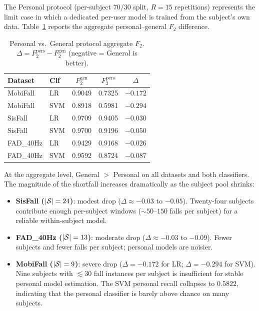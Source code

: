 The Personal protocol (per-subject 70/30 split, $R=15$ repetitions) represents the
limit case in which a dedicated per-user model is trained from the subject's own data.
Table~\ref{tab:personal-delta} reports the aggregate personal--general $F_2$ difference.

\begin{table}[h!]
\centering
\caption{Personal vs.\ General protocol aggregate $F_2$.
  $\Delta = F_2^{\mathrm{pers}} - F_2^{\mathrm{gen}}$ (negative = General is better).}
\label{tab:personal-delta}
\small
\begin{tabular}{llccc}
\toprule
\textbf{Dataset} & \textbf{Clf} & $F_2^{\mathrm{gen}}$ & $F_2^{\mathrm{pers}}$ & $\Delta$ \\
\midrule
MobiFall  & LR  & 0.9049 & 0.7325 & $-0.172$ \\
MobiFall  & SVM & 0.8918 & 0.5981 & $-0.294$ \\
SisFall   & LR  & 0.9709 & 0.9405 & $-0.030$ \\
SisFall   & SVM & 0.9700 & 0.9196 & $-0.050$ \\
FAD\_40Hz & LR  & 0.9429 & 0.9168 & $-0.026$ \\
FAD\_40Hz & SVM & 0.9592 & 0.8724 & $-0.087$ \\
\bottomrule
\end{tabular}
\end{table}

At the aggregate level, General $>$ Personal on all datasets and both classifiers.
The magnitude of the shortfall increases dramatically as the subject pool shrinks:

\begin{itemize}
\item \textbf{SisFall ($|\mathcal{S}|=24$)}: modest drop ($\Delta \approx -0.03$ to
  $-0.05$).  Twenty-four subjects contribute enough per-subject windows
  (${\sim}50$--$150$ falls per subject) for a reliable within-subject model.
\item \textbf{FAD\_40Hz ($|\mathcal{S}|=13$)}: moderate drop ($\Delta \approx -0.03$
  to $-0.09$).  Fewer subjects and fewer falls per subject; personal models are
  noisier.
\item \textbf{MobiFall ($|\mathcal{S}|=9$)}: severe drop ($\Delta=-0.172$ for LR;
  $\Delta=-0.294$ for SVM).  Nine subjects with $\lesssim30$ fall instances per
  subject is insufficient for stable personal model estimation.  The SVM personal
  recall collapses to $0.5822$, indicating that the personal classifier is barely
  above chance on many subjects.
\end{itemize}


